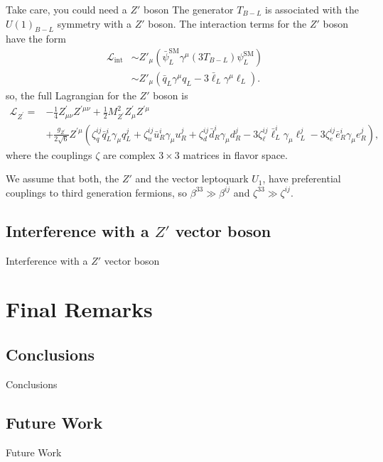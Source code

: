 \documentclass{../bredelebeamer}
\begin{document}
\begin{frame}{Take care, you could need a $Z'$ boson}
	The generator $T_{B-L}$ is associated with the $U(1)_{B-L}$ symmetry with a $Z'$ boson. The interaction terms for the $Z'$ boson have the form
	\begin{align*}
		\mathcal{L}_{\text{int}} &\sim Z'_\mu\left(\bar{\psi}_{L}^{\mathrm{SM}}\gamma^\mu (3T_{B-L}) \psi_{L}^{\mathrm{SM}}\right)\\
		&\sim Z'_\mu \left(\bar q_{L} \gamma^\mu q_{L} - 3 \bar \ell_L \gamma^\mu \ell_L\right).
	\end{align*}\pause
	so, the full Lagrangian for the $Z'$ boson is
	\begin{equation}
		\begin{aligned}
		\mathcal{L}_{Z^{\prime}}= & -\frac{1}{4} Z_{\mu \nu}^{\prime} Z^{\prime \mu \nu} +\frac{1}{2} M_{Z^{\prime}}^2 Z_\mu^{\prime} Z^{\prime \mu} \\
		& +\frac{g_{Z^{\prime}} }{2 \sqrt{6}} Z^{\prime \mu}\left(\zeta_q^{i j} \bar{q}_L^i \gamma_\mu q_L^j+\zeta_u^{i j} \bar{u}_R^i \gamma_\mu u_R^j+\zeta_d^{i j} \bar{d}_R^i \gamma_\mu d_R^j-3 \zeta_{\ell}^{i j} \bar{\ell}_L^i \gamma_\mu \ell_L^j-3 \zeta_e^{i j} \bar{e}_R^i \gamma_\mu e_R^j\right),
		\end{aligned}
	\end{equation}
	where the couplings $\zeta$ are complex $3\times 3$ matrices in flavor space.\pause

	\vfill
	We assume that both, the $Z'$ and the vector leptoquark $U_1$, have preferential couplings to third generation fermions, so $\beta^{33}\gg \beta^{ij}$ and $\zeta^{33}\gg \zeta^{ij}$.
\end{frame}



\subsection{Interference with a $Z'$ vector boson}
\begin{frame}{Interference with a $Z'$ vector boson}
    
\end{frame}

\section{Final Remarks}
\subsection{Conclusions}
\begin{frame}{Conclusions}

\end{frame}

\subsection{Future Work}
\begin{frame}{Future Work}

\end{frame}
\end{document}
